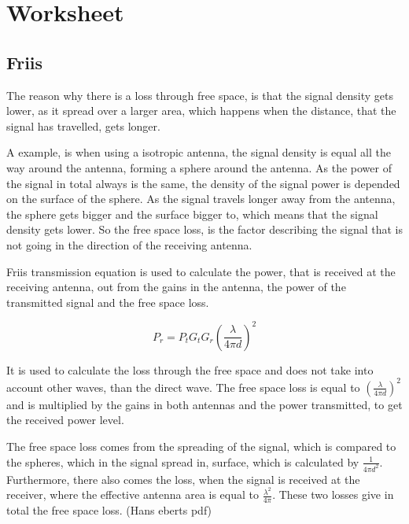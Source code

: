 \chapter{Worksheet}
\section{Friis}

The reason why there is a loss through free space, is that the signal density gets lower, as it spread over a larger area, which happens when the distance, that the signal has travelled, gets longer. 

A example, is when using a isotropic antenna, the signal density is equal all the way around the antenna, forming a sphere around the antenna. As the power of the signal in total always is the same, the density of the signal power is depended on the surface of the sphere. As the signal travels longer away from the antenna, the sphere gets bigger and the surface bigger to, which means that the signal density gets lower. So the free space loss, is the factor describing the signal that is not going in the direction of the receiving antenna.


Friis transmission equation is used to calculate the power, that is received at the receiving antenna, out from the gains in the antenna, the power of the transmitted signal and the free space loss. 

\begin{equation}
P_r = P_t G_t G_r (\frac{\lambda}{4 \pi d})^2
\end{equation}
\begin{where}
\end{where}

It is used to calculate the loss through the free space and does not take into account other waves, than the direct wave. The free space loss is equal to $(\frac{\lambda}{4 \pi d})^2$ and is multiplied by the gains in both antennas and the power transmitted, to get the received power level.

The free space loss comes from the spreading of the signal, which is compared to the spheres, which in the signal spread in, surface, which is calculated by $\frac{1}{4 \pi d^2}$. Furthermore, there also comes the loss, when the signal is received at the receiver, where the effective antenna area is equal to $\frac{\lambda^2}{4 \pi}$. These two losses give in total the free space loss. (Hans eberts pdf)


